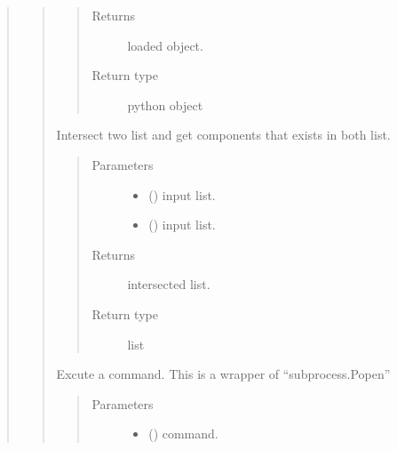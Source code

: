 \documentclass[letterpaper,10pt,english]{sphinxmanual}
\begin{document}
\begin{quote}
\begin{quote}
\begin{fulllineitems}
\begin{quote}
\begin{description}
\item[{Returns}] \leavevmode
loaded object.

\item[{Return type}] \leavevmode
python object

\end{description}\end{quote}

\end{fulllineitems}


\begin{fulllineitems}
\label{\detokenize{modules/celloracle.utility:celloracle.utility.intersect}}
Intersect two list and get components that exists in both list.
\begin{quote}\begin{description}
\item[{Parameters}] \leavevmode\begin{itemize}
\item {} 
 () \textendash{} input list.

\item {} 
 () \textendash{} input list.

\end{itemize}

\item[{Returns}] \leavevmode
intersected list.

\item[{Return type}] \leavevmode
list

\end{description}\end{quote}

\end{fulllineitems}


\begin{fulllineitems}
\label{\detokenize{modules/celloracle.utility:celloracle.utility.exec_process}}
Excute a command. This is a wrapper of “subprocess.Popen”
\begin{quote}\begin{description}
\item[{Parameters}] \leavevmode\begin{itemize}
\item {} 
 () \textendash{} command.


\end{itemize}
\end{description}
\end{quote}
\end{fulllineitems}
\end{quote}
\end{quote}
\end{document}
